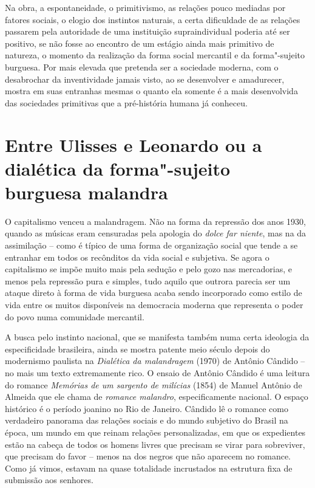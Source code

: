Na obra, a espontaneidade, o primitivismo, as relações pouco mediadas
por fatores sociais, o elogio dos instintos naturais, a certa
dificuldade de as relações passarem pela autoridade de uma instituição
supraindividual poderia até ser positivo, se não fosse ao encontro de um
estágio ainda mais primitivo de natureza, o momento da realização da
forma social mercantil e da forma"-sujeito burguesa. Por mais elevada que
pretenda ser a sociedade moderna, com o desabrochar da inventividade
jamais visto, ao se desenvolver e amadurecer, mostra em suas entranhas
mesmas o quanto ela somente é a mais desenvolvida das sociedades
primitivas que a pré-história humana já conheceu.

\section*{Entre Ulisses e Leonardo ou a dialética da forma"-sujeito burguesa malandra}

O capitalismo venceu a malandragem. Não na forma da repressão dos anos
1930, quando as músicas eram censuradas pela apologia do \emph{dolce far
niente}, mas na da assimilação -- como é típico de uma forma de
organização social que tende a se entranhar em todos os recônditos da
vida social e subjetiva. Se agora o capitalismo se impõe muito mais pela
sedução e pelo gozo nas mercadorias, e menos pela repressão pura e
simples, tudo aquilo que outrora parecia ser um ataque direto à forma de
vida burguesa acaba sendo incorporado como estilo de vida entre os
muitos disponíveis na democracia moderna que representa o poder do povo
numa comunidade mercantil.

A busca pelo instinto nacional, que se manifesta também numa certa
ideologia da especificidade brasileira, ainda se mostra patente meio
século depois do modernismo paulista na \emph{Dialética da malandragem}
(1970) de Antônio Cândido -- no mais um texto extremamente rico. O
ensaio de Antônio Cândido é uma leitura do romance \emph{Memórias de um
sargento de milícias} (1854) de Manuel Antônio de Almeida que ele chama
de \emph{romance malandro}, especificamente nacional. O espaço histórico
é o período joanino no Rio de Janeiro. Cândido lê o romance como
verdadeiro panorama das relações sociais e do mundo subjetivo do Brasil
na época, um mundo em que reinam relações personalizadas, em que os
expedientes estão na cabeça de todos os homens livres que precisam se
virar para sobreviver, que precisam do favor -- menos na dos negros que
não aparecem no romance. Como já vimos, estavam na quase totalidade
incrustados na estrutura fixa de submissão aos senhores.

